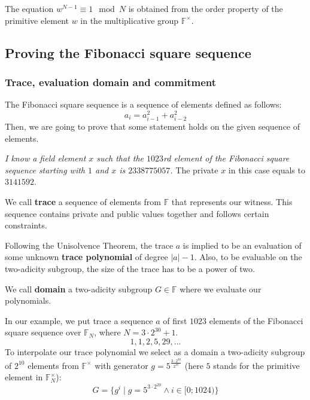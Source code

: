 \documentclass[../lecture-notes.tex]{subfiles}
\begin{document}
\begin{remark}
The equation $w^{N - 1} \equiv 1 \mod N$ is obtained from the order property of the primitive element $w$ in the multiplicative group $\mathbb{F}^{\times}$. 
\end{remark}

\subsection{Proving the Fibonacci square sequence}
\subsubsection{Trace, evaluation domain and commitment}
The Fibonacci square sequence is a sequence of elements defined as follows: 
\begin{equation*}
a_{i} = a_{i-1}^2 + a_{i-2}^2  
\end{equation*}
Then, we are going to prove that some statement holds on the given sequence of elements.
\begin{example}
\textit{I know a field element $x$ such that the $1023$rd element of the Fibonacci square sequence starting with $1$ and $x$ is $2338775057$.} The private $x$ in this case equals to $3141592$.    
\end{example}

\begin{definition}
We call \textbf{trace} a sequence of elements from $\mathbb{F}$ that represents our witness. This sequence contains private and public values together and follows certain constraints.
\end{definition}
Following the Unisolvence Theorem, the trace $a$ is implied to be an evaluation of some unknown \textbf{trace polynomial} of degree $|a| - 1$. Also, to be evaluable on the two-adicity subgroup, the size of the trace has to be a power of two.
\begin{definition}
We call \textbf{domain} a two-adicity subgroup $G \in \mathbb{F}$ where we evaluate our polynomials.
\end{definition}

\begin{example}
In our example, we put trace a sequence $a$ of first $1023$ elements of the Fibonacci square sequence over $\mathbb{F}_N$, where $N=3\cdot 2^{30} + 1$.
\begin{equation*}
1, 1, 2, 5, 29, ...
\end{equation*}
To interpolate our trace polynomial we select as a domain a two-adicity subgroup of $2^{10}$ elements from $\mathbb{F}^\times$ with generator $g = 5^{\frac{3\cdot 2^{30}}{2^{10}}}$ (here $5$ stands for the primitive element in $\mathbb{F}^\times_N$):
\begin{equation*}
G = \{g^i \;|\; g = 5^{3\cdot 2^{20}} \land i \in [0;1024) \}
\end{equation*}
\end{example}
\end{document}
